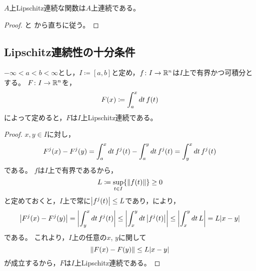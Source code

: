 \documentclass[b5paper,draft]{ltjsbook}
\begin{document}
\begin{cor}
    $A$上Lipschitz連続な関数は$A$上連続である。
    \begin{proof}
        と
        から直ちに従う。
    \end{proof}
\end{cor}



\subsection{Lipschitz連続性の十分条件}


\begin{prop}[原始関数のLipschitz連続性]
    $-\infty<a<b<\infty$とし，$I\coloneqq [a,b]$と定め，$f\colon I\to \mathbb{R}^n$は$I$上で有界かつ可積分とする。
    $F\colon I\to \mathbb{R}^n$を，
    \begin{equation}
        \fun{F}{x}\coloneqq \int_a^x dt\, \fun{f}{t}
    \end{equation}
    によって定めると，$F$は$I$上Lipschitz連続である。
    \begin{proof}
        $x,y\in I$に対し，
        \begin{equation}
            \fun{F^j}{x}-\fun{F^j}{y}=\int_a^x dt\, \fun{f^j}{t} - \int_a^y dt\, \fun{f^j}{t}=\int_y^x dt\, \fun{f^j}{t}
        \end{equation}
        である。
        $f$は$I$上で有界であるから，
        \begin{equation}
            L\coloneqq \sup_{t\in I}\bra{\norm{\fun{f}{t}}}\geq 0
        \end{equation}
        と定めておくと，$I$上で常に$\abs{\fun{f^j}{t}}\leq L$であり，により，
        \begin{equation}
            \abs{\fun{F^j}{x}-\fun{F^j}{y}}=\abs{\int_y^x dt\, \fun{f^j}{t}}
            \leq \abs{\int_x^y dt\, \abs{\fun{f^j}{t}}}\leq \abs{\int_x^y dt\, L}
            = L\abs{x-y}
        \end{equation}
        である。
        これより，$I$上の任意の$x$, $y$に関して
        \begin{equation}
            \norm{\fun{F}{x}-\fun{F}{y}}\leq L\abs{x-y}
        \end{equation}
        が成立するから，$F$は$I$上Lipschitz連続である。
    \end{proof}
\end{prop}
\end{document}
